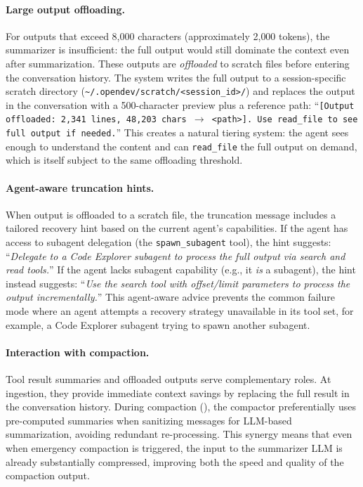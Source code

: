 \paragraph{Large output offloading.}
For outputs that exceed 8{,}000 characters (approximately 2{,}000 tokens), the summarizer is insufficient: the full output would still dominate the context even after summarization. These outputs are \emph{offloaded} to scratch files before entering the conversation history. The system writes the full output to a session-specific scratch directory (\texttt{\textasciitilde/.opendev/scratch/<session\_id>/}) and replaces the output in the conversation with a 500-character preview plus a reference path: ``\texttt{[Output offloaded: 2{,}341 lines, 48{,}203 chars $\to$ <path>]. Use read\_file to see full output if needed.}'' This creates a natural tiering system: the agent sees enough to understand the content and can \texttt{read\_file} the full output on demand, which is itself subject to the same offloading threshold.

\paragraph{Agent-aware truncation hints.} When output is offloaded to a scratch file, the truncation message includes a tailored recovery hint based on the current agent's capabilities. If the agent has access to subagent delegation (the \texttt{spawn\_subagent} tool), the hint suggests: ``\emph{Delegate to a Code Explorer subagent to process the full output via search and read tools.}'' If the agent lacks subagent capability (e.g., it \emph{is} a subagent), the hint instead suggests: ``\emph{Use the search tool with offset/limit parameters to process the output incrementally.}'' This agent-aware advice prevents the common failure mode where an agent attempts a recovery strategy unavailable in its tool set, for example, a Code Explorer subagent trying to spawn another subagent.

\paragraph{Interaction with compaction.}
Tool result summaries and offloaded outputs serve complementary roles. At ingestion, they provide immediate context savings by replacing the full result in the conversation history. During compaction (), the compactor preferentially uses pre-computed summaries when sanitizing messages for LLM-based summarization, avoiding redundant re-processing. This synergy means that even when emergency compaction is triggered, the input to the summarizer LLM is already substantially compressed, improving both the speed and quality of the compaction output.


